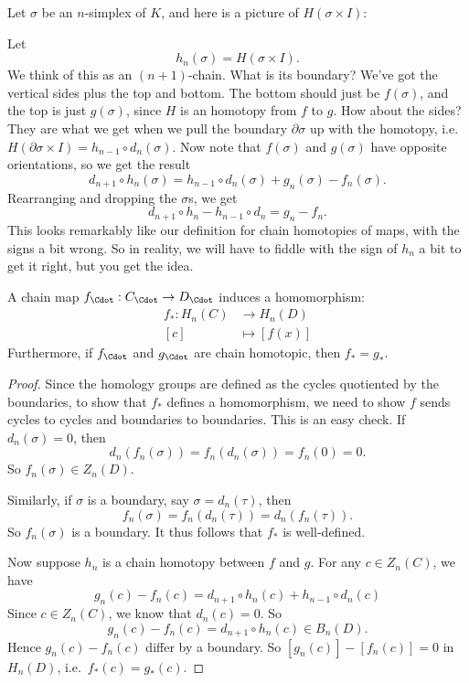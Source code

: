 \documentclass[a4paper]{article}
\begin{document}
Let $\sigma$ be an $n$-simplex of $K$, and here is a picture of $H(\sigma \times I)$:
\begin{center}
\end{center}
Let
\[
  h_n(\sigma) = H(\sigma \times I).
\]
We think of this as an $(n + 1)$-chain. What is its boundary? We've got the vertical sides plus the top and bottom. The bottom should just be $f(\sigma)$, and the top is just $g(\sigma)$, since $H$ is an homotopy from $f$ to $g$. How about the sides? They are what we get when we pull the boundary $\partial \sigma$ up with the homotopy, i.e.\ $H(\partial \sigma \times I) = h_{n - 1} \circ d_n(\sigma)$. Now note that $f(\sigma)$ and $g(\sigma)$ have opposite orientations, so we get the result
\[
  d_{n + 1} \circ h_n(\sigma) = h_{n - 1}\circ d_n(\sigma) + g_n(\sigma) - f_n(\sigma).
\]
Rearranging and dropping the $\sigma$s, we get
\[
  d_{n + 1} \circ h_n - h_{n - 1}\circ d_n = g_n - f_n.
\]
This looks remarkably like our definition for chain homotopies of maps, with the signs a bit wrong. So in reality, we will have to fiddle with the sign of $h_n$ a bit to get it right, but you get the idea.

\begin{lemma}
  A chain map $f_{\Cdot}: C_{\Cdot} \to D_{\Cdot}$ induces a homomorphism:
  \begin{align*}
    f_*: H_n(C) &\to H_n(D)\\
    [c] &\mapsto [f(x)]
  \end{align*}
  Furthermore, if $f_{\Cdot}$ and $g_{\Cdot}$ are chain homotopic, then $f_* = g_*$.
\end{lemma}

\begin{proof}
  Since the homology groups are defined as the cycles quotiented by the boundaries, to show that $f_*$ defines a homomorphism, we need to show $f$ sends cycles to cycles and boundaries to boundaries. This is an easy check. If $d_n (\sigma) = 0$, then
  \[
    d_n (f_n(\sigma)) = f_n(d_n(\sigma)) = f_n(0) = 0.
  \]
  So $f_n(\sigma) \in Z_n(D)$.

  Similarly, if $\sigma$ is a boundary, say $\sigma = d_n (\tau)$, then
  \[
    f_n(\sigma) = f_n(d_n(\tau)) = d_n(f_n(\tau)).
  \]
  So $f_n(\sigma)$ is a boundary. It thus follows that $f_*$ is well-defined.

  Now suppose $h_n$ is a chain homotopy between $f$ and $g$. For any $c \in Z_n(C)$, we have
  \[
    g_n(c) - f_n(c) = d_{n + 1} \circ h_n(c) + h_{n - 1} \circ d_n(c)
  \]
  Since $c \in Z_n(C)$, we know that $d_n(c) = 0$. So
  \[
    g_n(c) - f_n(c) = d_{n + 1} \circ h_n(c) \in B_n(D).
  \]
  Hence $g_n(c) - f_n(c)$ differ by a boundary. So $[g_n(c)] - [f_n(c)] = 0$ in $H_n(D)$, i.e.\ $f_*(c) = g_*(c)$.
\end{proof}
\end{document}
